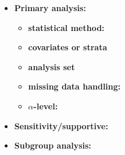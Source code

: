 \begin{itemize}
    \item \textbf{Primary analysis: }
    \begin{itemize}
        \item \textbf{statistical method: } %
        \item \textbf{covariates or strata} %
        \item \textbf{analysis set}

        \item \textbf{missing data handling: } %
        \item \textbf{$\alpha$-level: } %
    \end{itemize}
    
    \item \textbf{Sensitivity/supportive: }
    \item \textbf{Subgroup analysis: } %
\end{itemize}